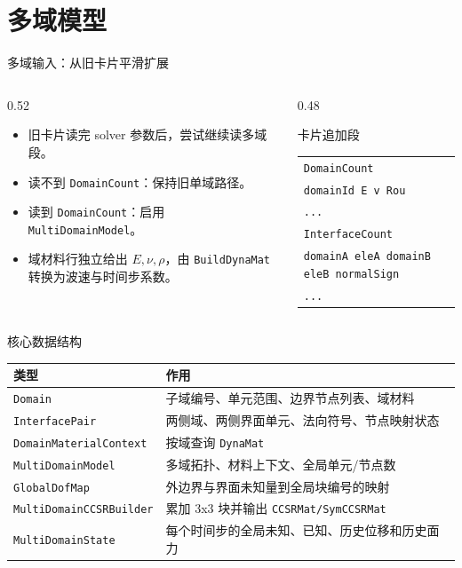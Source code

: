 \documentclass[aspectratio=169,UTF8]{ctexbeamer}
\newcommand{\code}[1]{\texttt{\small #1}}
\begin{document}
\section{多域模型}

\begin{frame}{多域输入：从旧卡片平滑扩展}
  \begin{columns}
    \begin{column}{0.52\textwidth}
      \begin{itemize}
        \item 旧卡片读完 solver 参数后，尝试继续读多域段。
        \item 读不到 \code{DomainCount}：保持旧单域路径。
        \item 读到 \code{DomainCount}：启用 \code{MultiDomainModel}。
        \item 域材料行独立给出 $E,\nu,\rho$，由 \code{BuildDynaMat} 转换为波速与时间步系数。
      \end{itemize}
    \end{column}
    \begin{column}{0.48\textwidth}
      \begin{block}{卡片追加段}
        \small
        \begin{tabular}{l}
          \code{DomainCount} \\
          \code{domainId E v Rou} \\
          \code{...} \\
          \code{InterfaceCount} \\
          \code{domainA eleA domainB eleB normalSign} \\
          \code{...}
        \end{tabular}
      \end{block}
    \end{column}
  \end{columns}
\end{frame}

\begin{frame}{核心数据结构}
  \begin{table}
    \centering
    \begin{tabular}{ll}
      \toprule
      类型 & 作用 \\
      \midrule
      \code{Domain} & 子域编号、单元范围、边界节点列表、域材料 \\
      \code{InterfacePair} & 两侧域、两侧界面单元、法向符号、节点映射状态 \\
      \code{DomainMaterialContext} & 按域查询 \code{DynaMat} \\
      \code{MultiDomainModel} & 多域拓扑、材料上下文、全局单元/节点数 \\
      \code{GlobalDofMap} & 外边界与界面未知量到全局块编号的映射 \\
      \code{MultiDomainCCSRBuilder} & 累加 3x3 块并输出 \code{CCSRMat/SymCCSRMat} \\
      \code{MultiDomainState} & 每个时间步的全局未知、已知、历史位移和历史面力 \\
      \bottomrule
    \end{tabular}
  \end{table}
\end{frame}
\end{document}
